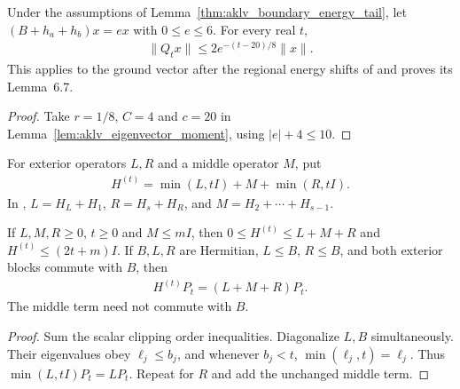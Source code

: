 \begin{lemma}
    \label{thm:aklv_ground_energy_tail}
    \leanok
    Under the assumptions of Lemma~\ref{thm:aklv_boundary_energy_tail},
    let $(B+h_a+h_b)x=ex$ with $0\le e\le6$. For every real $t$,
    \begin{align}
        \|Q_tx\|\le2e^{-(t-20)/8}\|x\|.
    \end{align}
    This applies to the ground vector after the regional energy shifts of
    \cite[Section~6.1]{Arad2013AreaLaw} and proves its Lemma~6.7.
\end{lemma}
\begin{proof}\leanok
    Take $r=1/8$, $C=4$ and $c=20$ in
    Lemma~\ref{lem:aklv_eigenvector_moment}, using $|e|+4\le10$.
\end{proof}

\begin{definition}
    \label{def:aklv_two_sided_truncation}
    \leanok
    For exterior operators $L,R$ and a middle operator $M$, put
    \begin{align}
        H^{(t)}=\min(L,tI)+M+\min(R,tI).
    \end{align}
    In \cite[Section~6.1]{Arad2013AreaLaw}, $L=H_L+H_1$,
    $R=H_s+H_R$, and $M=H_2+\cdots+H_{s-1}$.
\end{definition}

\begin{lemma}
    \label{lem:aklv_truncation_low_agreement}
    \leanok
    If $L,M,R\ge0$, $t\ge0$ and $M\le mI$, then
    $0\le H^{(t)}\le L+M+R$ and $H^{(t)}\le(2t+m)I$.
    If $B,L,R$ are Hermitian, $L\le B$, $R\le B$, and both exterior
    blocks commute with $B$, then
    \begin{align}
        H^{(t)}P_t=(L+M+R)P_t.
    \end{align}
    The middle term need not commute with $B$.
\end{lemma}
\begin{proof}\leanok
    Sum the scalar clipping order inequalities. Diagonalize $L,B$
    simultaneously. Their eigenvalues obey $\ell_j\le b_j$, and whenever
    $b_j<t$, $\min(\ell_j,t)=\ell_j$. Thus $\min(L,tI)P_t=LP_t$.
    Repeat for $R$ and add the unchanged middle term.
\end{proof}

